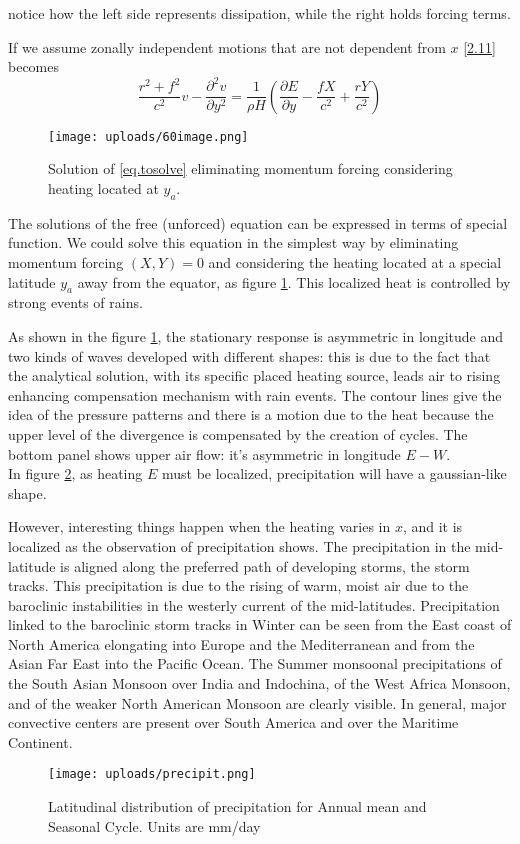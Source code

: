 notice how the left side represents dissipation, while the right holds forcing terms.

If we assume zonally independent motions that are not dependent from $x$ \ref{2.11} becomes
\begin{equation}\label{eq.tosolve}
	\frac{r^2 + f^2}{c^2} v - \frac{\partial^2 v}{\partial y^2} = \frac{1}{\rho H} \left( \frac{\partial E}{\partial y} - \frac{fX}{c^2} + \frac{rY}{c^2} \right)
\end{equation}
\begin{figure}[htpb]
	\centering
	\texttt{[image: uploads/60image.png]}
	\caption{Solution of \ref{eq.tosolve} eliminating momentum forcing considering heating located at $y_a$.}
	\label{fig:sol}
\end{figure}
The solutions of the free (unforced) equation can be expressed in terms of special function. We could solve this equation in the simplest way by eliminating momentum forcing $(X,Y)=0$ and considering the heating located at a special latitude $y_a$ away from the equator, as figure \ref{fig:sol}. This localized heat is controlled by strong events of rains.

As shown in the figure \ref{fig:sol}, the stationary response is asymmetric in longitude and two kinds of waves developed with different shapes: this is due to the fact that the analytical solution, with its specific placed heating source, leads air to rising enhancing compensation mechanism with rain events.
The contour lines give the idea of the pressure patterns and there is a motion due to the heat because the upper level of the divergence is compensated by the creation of cycles. The bottom panel shows upper air flow: it's asymmetric in longitude $E-W$. \\

In figure \ref{fig:precipitation}, as heating $E$ must be localized, precipitation will have a gaussian-like shape.

However, interesting things happen when the heating varies in $x$, and it is localized as the observation of precipitation shows. The precipitation in the mid-latitude is aligned along the preferred path of developing storms, the storm tracks. This precipitation is due to the rising of warm, moist air due to the baroclinic instabilities in the westerly current of the mid-latitudes. Precipitation linked to the baroclinic storm tracks in Winter can be seen from the East coast of North America elongating into Europe and the Mediterranean and from the Asian Far East into the Pacific Ocean. The Summer monsoonal precipitations of the South Asian Monsoon over India and Indochina, of the West Africa Monsoon, and of the weaker North American Monsoon are clearly visible. In general, major convective centers are present over South America and over the Maritime Continent.
\begin{figure}[htpb]
	\centering
	\texttt{[image: uploads/precipit.png]}
	\caption{Latitudinal distribution of precipitation for Annual
		mean and Seasonal Cycle. Units are mm/day}
	\label{fig:precipitation}
\end{figure}


